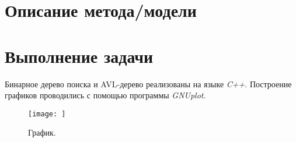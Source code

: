 \documentclass[12pt, a4paper]{report}
\begin{document}
	\section*{Описание метода/модели}
	\large

	\newpage

	\section*{Выполнение задачи}
	Бинарное дерево поиска и AVL-дерево реализованы на языке \textit{C++}. Построение графиков проводились с помощью программы \textit{GNUplot}.

	\newpage
	\vfill

	\begin{figure}[h]
		\centering
		\texttt{[image: ]}
		\caption{График.}
	\end{figure}
\end{document}
